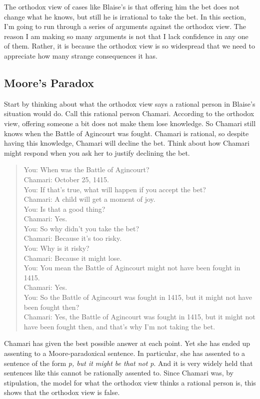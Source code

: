 \documentclass[
  12pt,
  letterpaper,
]{scrbook}
\begin{document}
The orthodox view of cases like Blaise's is that offering him the bet
does not change what he knows, but still he is irrational to take the
bet. In this section, I'm going to run through a series of arguments
against the orthodox view. The reason I am making so many arguments is
not that I lack confidence in any one of them. Rather, it is because the
orthodox view is so widespread that we need to appreciate how many
strange consequences it has.

\subsection{Moore's Paradox}\label{sec-orthodoxmoore}

Start by thinking about what the orthodox view says a rational person in
Blaise's situation would do. Call this rational person Chamari.
According to the orthodox view, offering someone a bit does not make
them lose knowledge. So Chamari still knows when the Battle of Agincourt
was fought. Chamari is rational, so despite having this knowledge,
Chamari will decline the bet. Think about how Chamari might respond when
you ask her to justify declining the bet.

\begin{quote}
You: When was the Battle of Agincourt?\\
Chamari: October 25, 1415.\\
You: If that's true, what will happen if you accept the bet?\\
Chamari: A child will get a moment of joy.\\
You: Is that a good thing?\\
Chamari: Yes.\\
You: So why didn't you take the bet?\\
Chamari: Because it's too risky.\\
You: Why is it risky?\\
Chamari: Because it might lose.\\
You: You mean the Battle of Agincourt might not have been fought in
1415.\\
Chamari: Yes.\\
You: So the Battle of Agincourt was fought in 1415, but it might not
have been fought then?\\
Chamari: Yes, the Battle of Agincourt was fought in 1415, but it might
not have been fought then, and that's why I'm not taking the bet.
\end{quote}

Chamari has given the best possible answer at each point. Yet she has
ended up assenting to a Moore-paradoxical sentence. In particular, she
has assented to a sentence of the form \emph{p, but it might be that not
p}. And it is very widely held that sentences like this cannot be
rationally assented to. Since Chamari was, by stipulation, the model for
what the orthodox view thinks a rational person is, this shows that the
orthodox view is false.
\end{document}

